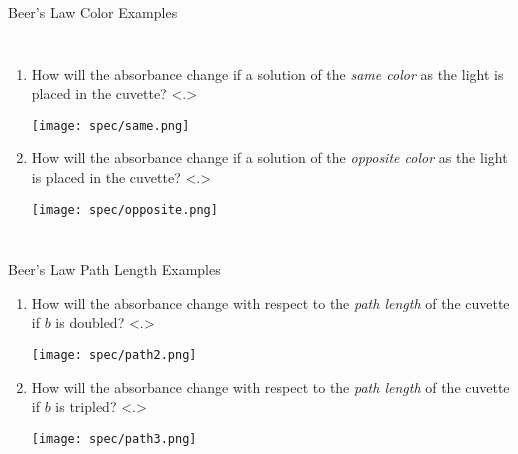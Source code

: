\documentclass[notes=show]{beamer}
\begin{document}
\begin{frame}{Beer's Law Color Examples}
	\begin{columns}
		\begin{enumerate}[<+->]
			\item How will the absorbance change if a solution of the
				\emph{same color} as the light is placed in the
				cuvette?
				\note<.>{%
					\begin{center}
						\texttt{[image: spec/same.png]}
					\end{center}
				}
			\item How will the absorbance change if a solution of the
				\emph{opposite color} as the light is placed in the
				cuvette?
			\note<.>{%
				\begin{center}
					\texttt{[image: spec/opposite.png]}
				\end{center}
			}
		\end{enumerate}
		\onslide<+->
	\end{columns}
\end{frame}

\begin{frame}[t]{Beer's Law Path Length Examples}
	\begin{enumerate}
		\item How will the absorbance change with respect to the
			\emph{path length} of the cuvette if $b$ is doubled?
			\note<.>{%
				\begin{center}
					\texttt{[image: spec/path2.png]}
				\end{center}
			}
		\item How will the absorbance change with respect to the
			\emph{path length} of the cuvette if $b$ is tripled?
			\note<.>{%
				\begin{center}
					\texttt{[image: spec/path3.png]}
				\end{center}
			}
	\end{enumerate}
\end{frame}
\end{document}
